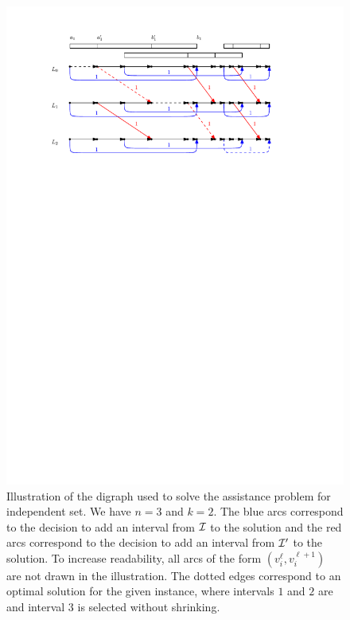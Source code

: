 \begin{figure}[t]
\centering
\includegraphics[width=\linewidth]{chapter-3-interdiction/figure_independent_set_assistance}
\caption{Illustration of the digraph used to solve the assistance problem for independent set. We have $n=3$ and $k=2$. 
The blue arcs correspond to the decision to add an interval from $\mathcal{I}$ to the solution and 
the red arcs correspond to the decision to add an interval from $\mathcal{I}'$ to the solution. To increase 
readability, all arcs of the form $(v_i^{\ell}, v_i^{\ell+1})$ are not drawn in the illustration.
The dotted edges correspond to an optimal solution for the given instance, where 
intervals $1$ and $2$ are  and interval $3$ is selected without shrinking.}
\label{figure:indendent_set_assistance}
\end{figure}

